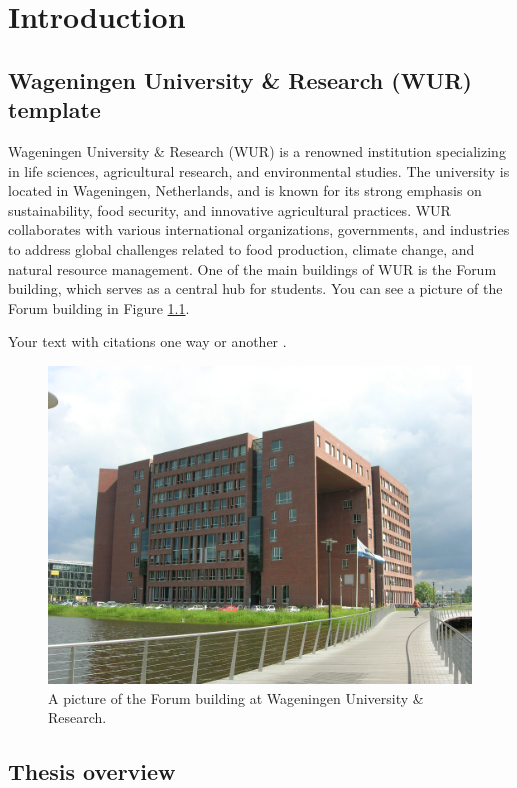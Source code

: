\chapter[Introduction]{Introduction}
\label{cha:chapter1}
\vspace*{\fill}


\newpage

\section{Wageningen University \& Research (WUR) template}
Wageningen University \& Research (WUR) is a renowned institution specializing in life sciences, agricultural research, and environmental studies. The university is located in Wageningen, Netherlands, and is known for its strong emphasis on sustainability, food security, and innovative agricultural practices. WUR collaborates with various international organizations, governments, and industries to address global challenges related to food production, climate change, and natural resource management. One of the main buildings of WUR is the Forum building, which serves as a central hub for students. You can see a picture of the Forum building in Figure \ref{fig:forum_wur_building}.

Your text with citations one way \cite{example_author_example_2024} or another \citep{example_author_example_2024}.


\begin{figure}[!ht]
    \centering
    \includegraphics[width=0.75\linewidth]{assets/ch1/WUR_forum_building.jpg}
    \caption{A picture of the Forum building at Wageningen University \& Research.}
    \label{fig:forum_wur_building}
\end{figure}

\lipsum[1-5]      %

\section{Thesis overview}

\lipsum[6]